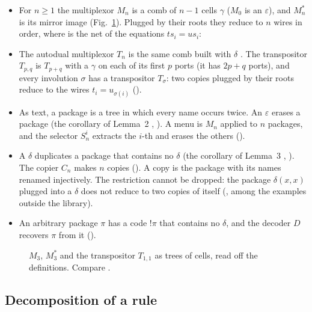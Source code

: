 \documentclass[11pt,a4paper]{article}
\newcommand{\lean}[1]{%
  \VerbatimInput[frame=single,rulecolor=\color{codeframe},framesep=1.6mm,breaklines=true,
    breakanywhere=false,breaksymbolleft={},samepage=true,fontsize=\fontsize{7.4}{9.0}\selectfont]{snip/#1.lean}}
\newcommand{\pp}[1]{\cite[#1]{lafont1997}}
\begin{document}
\begin{itemize}
\item For $n \ge 1$ the multiplexor $M_n$ is a comb of $n - 1$ cells $\gamma$ ($M_0$ is an
  $\varepsilon$), and $M_n^*$ is its mirror image \pp{Fig.~4} (Fig.~\ref{fig:mux}). Plugged by
  their roots they reduce to $n$ wires in order, where  is the net of the
  equations $ts_i = us_i$:
  \lean{mux_prop}
\item The autodual multiplexor $T_n$ is the same comb built with $\delta$ \pp{Fig.~5}. The
  transpositor $T_{p,q}$ is $T_{p+q}$ with a $\gamma$ on each of its first $p$ ports (it has $2p + q$ ports), and
  every involution $\sigma$ has a transpositor $T_\sigma$: two copies plugged by their roots
  reduce to the wires $t_i = u_{\sigma(i)}$ \mbox{()}.
\item As text, a package is a tree in which every name occurs twice. An $\varepsilon$ erases a
  package (the corollary of Lemma~2 \pp{pp.~84--85}, ). A menu is $M_n$ applied to $n$ packages,
  and the selector $S^i_n$ extracts the $i$-th and erases the others
  ().
\item A $\delta$ duplicates a package that contains no $\delta$ (the corollary of Lemma~3
  \pp{p.~87}, ). The copier $C_n$ makes $n$ copies
  (). A copy is the package with its names renamed injectively. The
  restriction cannot be dropped: the package $\delta(x, x)$ plugged into a $\delta$ does not
  reduce to two copies of itself (, among the examples
  outside the library).
\item An arbitrary package $\pi$ has a code $!\pi$ that contains no $\delta$, and the decoder
  $D$ recovers $\pi$ from it \pp{Figs.~8 and~9} ().
\end{itemize}

\begin{figure}[H]
\centering

\caption{$M_3$, $M_3^*$ and the transpositor $T_{1,1}$ as trees of cells, read off the
definitions. Compare \pp{Fig.~4 and p.~83}.}
\label{fig:mux}
\end{figure}

\subsection{Decomposition of a rule}
\label{sec:decomp}
\end{document}
